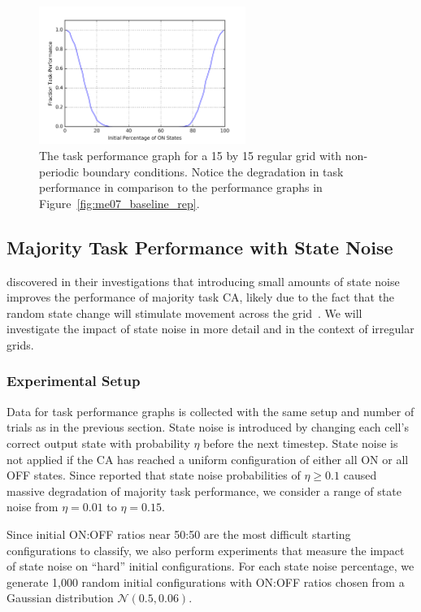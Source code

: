 \documentclass[a4paper,11pt]{article}
\begin{document}
\begin{figure}[htp]
\centering
\includegraphics[width=0.6\textwidth]{ch5_figs/lm_baseline_reg_nontor}
\caption[Local Majority Task Performance on a Non-Periodic Regular Grid]{
  The task performance graph for a 15 by 15 regular grid with non-periodic boundary conditions. Notice the degradation in task performance in comparison to the performance graphs in Figure~\ref{fig:me07_baseline_rep}.
}
\label{fig:lm_reg_nonper}
\end{figure}

\subsection{Majority Task Performance with State Noise}

\citeauthor{me07} discovered in their investigations that introducing small amounts of state noise improves the performance of majority task CA, likely due to the fact that the random state change will stimulate movement across the grid~\cite{me07}. We will investigate the impact of state noise in more detail and in the context of irregular grids.

\subsubsection*{Experimental Setup}

Data for task performance graphs is collected with the same setup and number of trials as in the previous section. State noise is introduced by changing each cell's correct output state with probability $\eta$ before the next timestep. State noise is not applied if the CA has reached a uniform configuration of either all ON or all OFF states. Since \citeauthor{me07} reported that state noise probabilities of $\eta \ge 0.1$ caused massive degradation of majority task performance, we consider a range of state noise from $\eta=0.01$ to $\eta=0.15$.

Since initial ON:OFF ratios near 50:50 are the most difficult starting configurations to classify, we also perform experiments that measure the impact of state noise on ``hard'' initial configurations. For each state noise percentage, we generate 1,000 random initial configurations with ON:OFF ratios chosen from a Gaussian distribution $\mathcal{N}(0.5, 0.06)$.
\end{document}
